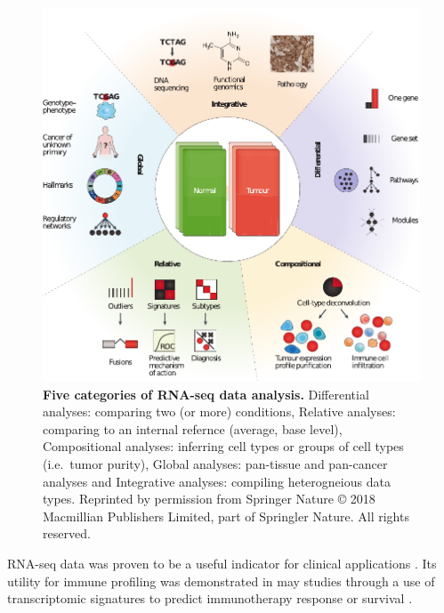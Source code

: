 \documentclass[12pt,]{book}
\theoremstyle{definition}
\theoremstyle{definition}
\theoremstyle{definition}
\theoremstyle{remark}
\begin{document}
\begin{figure}

{\centering \includegraphics[width=1\linewidth]{figures-ext/transcriptome-methods} 

}

\caption{\textbf{Five categories of RNA-seq
data analysis.} Differential analyses: comparing two (or more)
conditions, Relative analyses: comparing to an internal refernce
(average, base level), Compositional analyses: inferring cell types or
groups of cell types (i.e.~tumor purity), Global analyses: pan-tissue
and pan-cancer analyses and Integrative analyses: compiling
heterogneious data types. Reprinted by permission from Springer Nature
\citep{Cieslik2017} © 2018 Macmillian Publishers Limited, part of
Springler Nature. All rights reserved.}\label{fig:transcriptome-methods}
\end{figure}











RNA-seq data was proven to be a useful indicator for clinical
applications \citep{Mody2015, Oberg2016, Robinson2017}. Its utility for
immune profiling was demonstrated in may studies through a use of
transcriptomic signatures to predict immunotherapy response or survival
\citep{Chen2016}.
\end{document}
